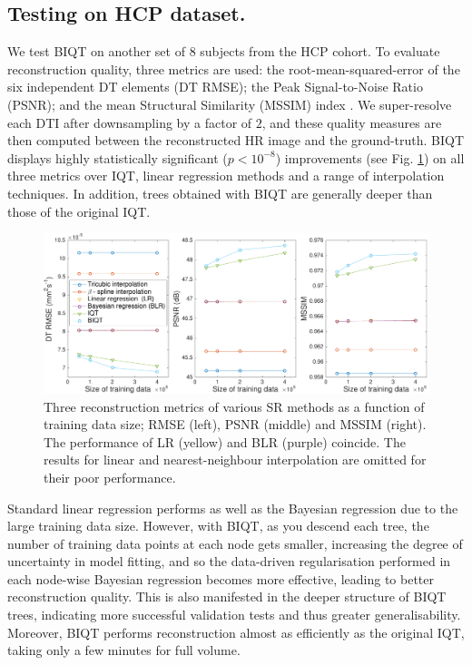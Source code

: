 	\subsection{Testing on HCP dataset.}
	We test BIQT on another set of $8$ subjects from the HCP cohort. To evaluate reconstruction quality, three metrics are used: the root-mean-squared-error of the six independent DT elements (DT RMSE); the Peak Signal-to-Noise Ratio (PSNR); and the mean Structural Similarity (MSSIM) index \cite{wang2004image}. We super-resolve each DTI after downsampling by a factor of $2$, and these quality measures are then computed between the reconstructed HR image and the ground-truth.  BIQT displays highly statistically significant ($p<10^{-8}$) improvements (see Fig. \ref{fig:performance}) on all three metrics over IQT, linear regression methods and a range of interpolation techniques. In addition, trees obtained with BIQT are generally deeper than those of the original IQT.
	\begin{figure}[ht]
		\centering\includegraphics[width= \linewidth]{chapter_2/figure_3.pdf}
		\small 
		\caption{\small Three reconstruction metrics of various SR methods as a function of training data size; RMSE (left), PSNR (middle) and MSSIM (right). The performance of LR (yellow) and BLR (purple) coincide. The results for linear and nearest-neighbour interpolation are omitted for their poor performance.} 
		\label{fig:performance}
	\end{figure}

	Standard linear regression performs as well as the Bayesian regression due to the large training data size. However, with BIQT, as you descend each tree, the number of training data points at each node gets smaller, increasing the degree of uncertainty in model fitting, and so the data-driven regularisation performed in each node-wise Bayesian regression becomes more effective, leading to better reconstruction quality. This is also manifested in the deeper structure of BIQT trees, indicating more successful validation tests and thus greater generalisability. Moreover, BIQT performs reconstruction almost as efficiently as the original IQT, taking only a few minutes for full volume.
			
